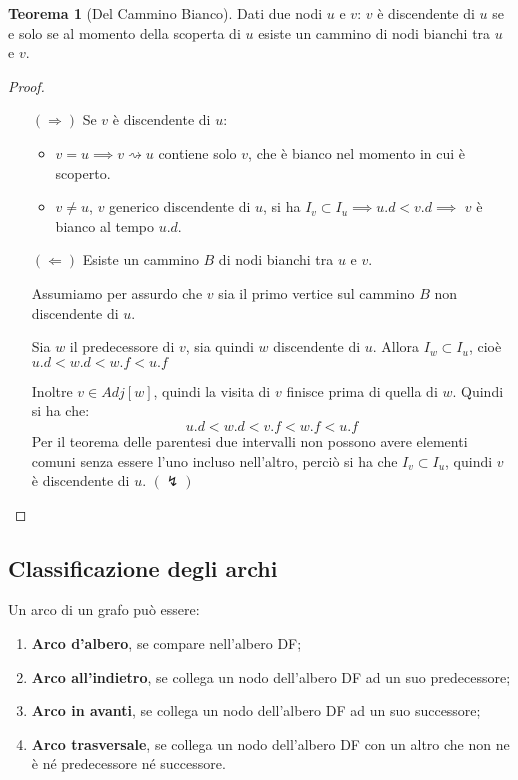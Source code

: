 \documentclass[a4paper,10pt]{article}
\theoremstyle{definition}
\newtheorem{teo}[deff]{Teorema}
\begin{document}
\begin{teo}[Del Cammino Bianco]
Dati due nodi $u$ e $v$: $v$ è discendente di $u$ se e solo se al momento della scoperta di $u$ esiste un cammino di nodi bianchi tra $u$ e $v$.
\begin{proof}
    \begin{enumerate}
    \item[]
    \item [$(\Longrightarrow)$] Se $v$ è discendente di $u$:
    \begin{itemize}
     \item $v=u \implies v \rightsquigarrow u$ contiene solo $v$, che è bianco nel momento in cui è scoperto.
     \item $v \neq u$, $v$ generico discendente di $u$, si ha $I_v \subset I_u \implies u.d < v.d \implies$ $v$ è bianco al tempo $u.d$.
    \end{itemize}

    \item [$(\Longleftarrow)$] Esiste un cammino $B$ di nodi bianchi tra $u$ e $v$. 
    
    Assumiamo per assurdo che $v$ sia il primo vertice sul cammino $B$ non discendente di $u$. 
    
    Sia $w$ il predecessore di $v$, sia quindi $w$ discendente di $u$. Allora $I_w \subset I_u$, cioè $u.d < w.d < w.f < u.f$
    
     Inoltre $v \in Adj[w]$, quindi la visita di $v$ finisce prima di quella di $w$. Quindi si ha che:
    \[u.d < w.d < v.f < w.f < u.f\]
    Per il teorema delle parentesi due intervalli non possono avere elementi comuni senza essere l'uno incluso nell'altro, perciò si ha che $I_v \subset I_u$, quindi $v$ è discendente di $u$. $(\lightning)$
    \end{enumerate}

\end{proof}

\end{teo}

\subsection{Classificazione degli archi}
Un arco di un grafo può essere:
\begin{enumerate}
 \item \textbf{Arco d'albero}, se compare nell'albero DF;
 \item \textbf{Arco all'indietro}, se collega un nodo dell'albero DF ad un suo predecessore;
 \item \textbf{Arco in avanti}, se collega un nodo dell'albero DF ad un suo successore;
 \item \textbf{Arco trasversale}, se collega un nodo dell'albero DF con un altro che non ne è né predecessore né successore.
\end{enumerate}
\end{document}
